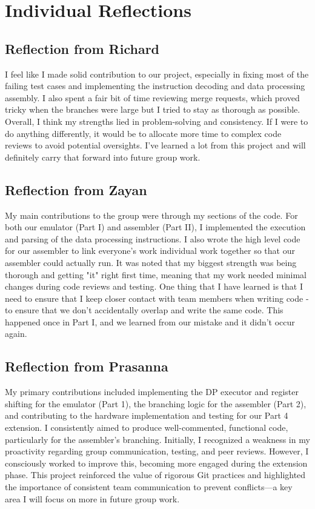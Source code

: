 \documentclass[11pt]{article}
\begin{document}
\section{Individual Reflections}
\subsection{Reflection from Richard}
I feel like I made solid contribution to our project, especially in fixing most of the failing test cases and implementing the 
instruction decoding and data processing assembly. I also spent a fair bit of time reviewing merge requests, which proved tricky 
when the branches were large but I tried to stay as thorough as possible. Overall, I think my strengths lied in problem-solving and 
consistency. If I were to do anything differently, it would be to allocate more time to complex code 
reviews to avoid potential oversights. I've learned a lot from this project and will definitely carry that forward into future group work.

\subsection{Reflection from Zayan}
My main contributions to the group were through my sections of the code. For both our emulator (Part I) and assembler (Part II), I implemented the 
execution and parsing of the data processing instructions. I also wrote the high level code for our assembler to link everyone's work individual work 
together so that our assembler could actually run. It was noted that my biggest strength was being thorough and getting "it" right first time, meaning that 
my work needed minimal changes during code reviews and testing. One thing that I have learned is that I need to ensure that I keep closer contact with 
team members when writing code - to ensure that we don't accidentally overlap and write the same code. This happened once in Part I, and we learned from our 
mistake and it didn't occur again.

\subsection{Reflection from Prasanna}
My primary contributions included implementing the DP executor and register shifting for the emulator (Part 1), the branching logic for the assembler (Part 2), and contributing to the hardware implementation and testing for our Part 4 extension. I consistently aimed to produce well-commented, functional code, particularly for the assembler's branching. Initially, I recognized a weakness in my proactivity regarding group communication, testing, and peer reviews. However, I consciously worked to improve this, becoming more engaged during the extension phase. This project reinforced the value of rigorous Git practices and highlighted the importance of consistent team communication to prevent conflicts—a key area I will focus on more in future group work.
\end{document}
